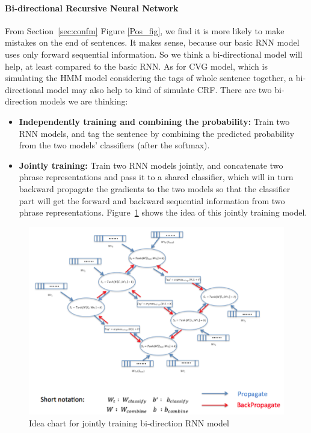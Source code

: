 \documentclass[11pt]{article}
\begin{document}
\paragraph{Bi-directional Recursive Neural Network}
From Section~\ref{sec:confm} Figure \ref{Pos_fig}, we find it is more likely to make mistakes on the end of sentences. It makes sense, because our basic RNN model uses only forward sequential information. So we think a bi-directional model will help, at least compared to the basic RNN. As for CVG model, which is simulating the HMM model considering the tags of whole sentence together, a bi-directional model may also help to kind of simulate CRF. There are two bi-direction models we are thinking:
\begin{itemize}
\item \textbf{Independently training and combining the probability: } Train two RNN models, and tag the sentence by combining the predicted probability from the two models' classifiers (after the softmax). 
\item \textbf{Jointly training: } Train two RNN models jointly, and concatenate two phrase representations and pass it to a shared classifier, which will in turn backward propagate the gradients to the two models so that the classifier part will get the forward and backward sequential information from two phrase representations. Figure~\ref{fig:bi-direc} shows the idea of this jointly training model.
\end{itemize}
\begin{figure}
\includegraphics[scale=0.5]{bi_direct.png}
\caption{Idea chart for jointly training bi-direction RNN model}\label{fig:bi-direc}
\end{figure}
\end{document}
